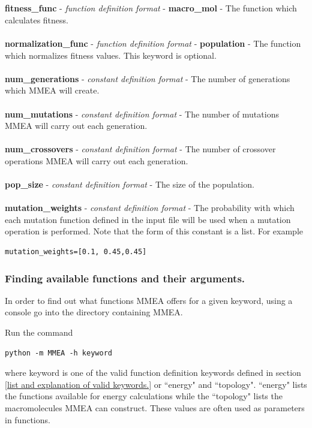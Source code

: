 \documentclass[12pt]{article}
\begin{document}
\\
\\
\textbf{fitness\_func} - \textit{function definition format} - \textbf{macro\_mol} - The function which calculates fitness.
\\
\\
\textbf{normalization\_func} - \textit{function definition format} - \textbf{population} - The function which normalizes fitness values. This keyword is optional.
\\
\\
\textbf{num\_generations} - \textit{constant definition format} - The number of generations which MMEA will create.
\\
\\
\textbf{num\_mutations} - \textit{constant definition format} - The number of mutations MMEA will carry out each generation.
\\
\\
\textbf{num\_crossovers} - \textit{constant definition format} - The number of crossover operations MMEA will carry out each generation.
\\
\\
\textbf{pop\_size} - \textit{constant definition format} - The size of the population.
\\
\\
\textbf{mutation\_weights} - \textit{constant definition format} - The probability with which each mutation function defined in the input file will be used when a mutation operation is performed. Note that the form of this constant is a list. For example
\begin{verbatim}
mutation_weights=[0.1, 0.45,0.45]
\end{verbatim}

\subsubsection{Finding available functions and their arguments.}
\label{Finding available functions and their arguments.}
In order to find out what functions MMEA offers for a given keyword, using a console go into the directory containing MMEA. 

Run the command 
\begin{verbatim}
python -m MMEA -h keyword
\end{verbatim}
where keyword is one of the valid function definition keywords defined in section \ref{list and explanation of valid keywords.} or ``energy" and ``topology". ``energy" lists the functions available for energy calculations while the ``topology" lists the macromolecules MMEA can construct. These values are often used as parameters in functions.
\end{document}
